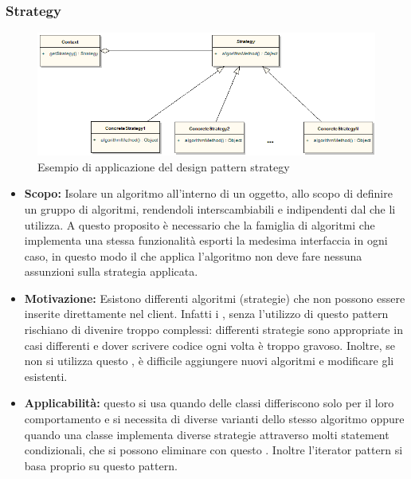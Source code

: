 \documentclass{scalatekids-article}
\begin{document}
\subsubsection{Strategy}
\begin{figure}[H]
  \begin{center}
    \includegraphics[width=1.0\textwidth, keepaspectratio]{img/designPattern/StrategyPattern.png}
    \caption{Esempio di applicazione del design pattern strategy}
  \end{center}
\end{figure}
\begin{itemize}
\item \textbf{Scopo:} Isolare un algoritmo all'interno di un oggetto, allo scopo di definire un gruppo di algoritmi, rendendoli
  interscambiabili e indipendenti dal  che li utilizza. A questo proposito è necessario che la famiglia di algoritmi che implementa una stessa funzionalità esporti la medesima interfaccia in ogni caso, in questo modo il  che applica l'algoritmo non deve fare nessuna assunzioni sulla strategia applicata.
\item \textbf{Motivazione:} Esistono differenti algoritmi (strategie) che non possono essere inserite direttamente nel client. Infatti i , senza l'utilizzo di questo pattern rischiano di divenire troppo complessi: differenti strategie sono appropriate in casi differenti e dover scrivere codice ogni volta è troppo gravoso. Inoltre, se non si utilizza questo , è difficile aggiungere nuovi algoritmi e modificare gli esistenti.
\item \textbf{Applicabilità:} questo  si usa quando delle classi differiscono solo per il loro comportamento e si necessita di diverse varianti dello stesso algoritmo oppure quando una classe implementa diverse strategie attraverso molti statement condizionali, che si possono eliminare con questo . Inoltre l'iterator pattern si basa proprio su questo pattern.
\end{itemize}
\newpage
\listoftables
\newpage
\listoffigures
\end{document}
